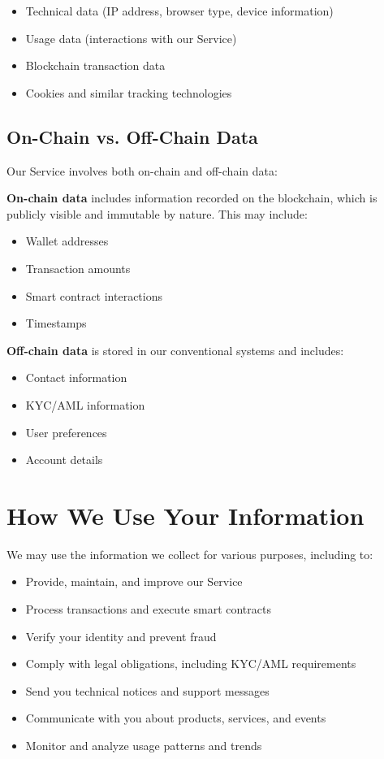 \documentclass[12pt]{article}
\begin{document}
\begin{itemize}
    \item Technical data (IP address, browser type, device information)
    \item Usage data (interactions with our Service)
    \item Blockchain transaction data
    \item Cookies and similar tracking technologies
\end{itemize}

\subsection{On-Chain vs. Off-Chain Data}

Our Service involves both on-chain and off-chain data:

\textbf{On-chain data} includes information recorded on the blockchain, which is publicly visible and immutable by nature. This may include:
\begin{itemize}
    \item Wallet addresses
    \item Transaction amounts
    \item Smart contract interactions
    \item Timestamps
\end{itemize}

\textbf{Off-chain data} is stored in our conventional systems and includes:
\begin{itemize}
    \item Contact information
    \item KYC/AML information
    \item User preferences
    \item Account details
\end{itemize}

\section{How We Use Your Information}

We may use the information we collect for various purposes, including to:

\begin{itemize}
    \item Provide, maintain, and improve our Service
    \item Process transactions and execute smart contracts
    \item Verify your identity and prevent fraud
    \item Comply with legal obligations, including KYC/AML requirements
    \item Send you technical notices and support messages
    \item Communicate with you about products, services, and events
    \item Monitor and analyze usage patterns and trends
\end{itemize}
\end{document}

